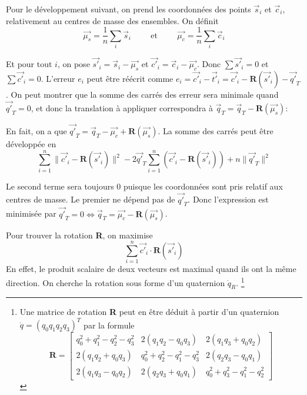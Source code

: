 \documentclass[a4paper,10pt]{scrreprt}
\begin{document}
Pour le développement suivant, on prend les coordonnées des points $\vec{s}_i$ et $\vec{c}_i$, relativement au centres de masse des ensembles. On définit
\begin{equation}
	\vec{\mu_s} = \frac{1}{n} \sum_{i} \vec{s}_i
	\hspace{1cm} \text{et} \hspace{1cm}
	\vec{\mu_c} = \frac{1}{n} \sum_{i} \vec{c}_i
\end{equation}

Et pour tout $i$, on pose $\vec{s'}_i = \vec{s}_i - \vec{\mu_s}$ et $\vec{c'}_i = \vec{c}_i - \vec{\mu_c}$. Donc $\sum \vec{s'}_i = 0$ et $\sum \vec{c'}_i = 0$. L'erreur $e_i$ peut être réécrit comme $e_i = \vec{c'}_i - \vec{t'}_i = \vec{c'}_i - \mathbf{R}(\vec{s'}_i) - \vec{q'}_T$. On peut montrer que la somme des carrés des erreur sera minimale quand $\vec{q'}_T = 0$, et donc la translation à appliquer correspondra à $\vec{q}_T = \vec{q}_T - \mathbf{R}(\vec{\mu_s})$:

En fait, on a que $\vec{q'}_T = \vec{q}_T - \vec{\mu_c} + \mathbf{R}(\vec{\mu_s})$. La somme des carrés peut être développée en
\begin{equation}
	\sum_{i=1}^{n} \| \vec{c'}_i - \mathbf{R}(\vec{s'}_i) \|^2 - 2 \vec{q'}_T \sum_{i=1}^{n} (\vec{c'}_i - \mathbf{R}(\vec{s'}_i)) + n \|\vec{q'}_T\|^2
\end{equation}

Le second terme sera toujours $0$ puisque les coordonnées sont pris relatif aux centres de masse. Le premier ne dépend pas de $\vec{q'}_T$. Donc l'expression est minimisée par $\vec{q'}_T = 0 \iff \vec{q}_T = \vec{\mu_c} - \mathbf{R}(\vec{\mu_s})$.

Pour trouver la rotation \textbf{R}, on maximise
\begin{equation}
	\sum_{i=1}^{n} \vec{c'}_{i} \cdot \mathbf{R}(\vec{s'}_i)
\end{equation}
En effet, le produit scalaire de deux vecteurs est maximal quand ils ont la même direction. On cherche la rotation sous forme d'un quaternion $\dot{q}_R$.
\footnote{Une matrice de rotation \textbf{R} peut en être déduit à partir d'un quaternion $\dot{q} = (q_0 q_1 q_2 q_3)^T$ par la formule
\begin{equation}
	\mathbf{R} = \begin{bmatrix}
		q_0^2 + q_1^2 - q_2^2 - q_3^2 & 2(q_1 q_2 - q_0 q_3) & 2(q_1 q_3 + q_0 q_2) \\
		2(q_1 q_2 + q_0 q_3) & q_0^2 + q_2^2 - q_1^2 - q_3^2 & 2(q_2 q_3 - q_0 q_1) \\
		2(q_1 q_3 - q_0 q_2) & 2(q_2 q_3 + q_0 q_1) & q_0^2 + q_3^2 - q_1^2 - q_2^2
	\end{bmatrix}
\end{equation}}
\end{document}
